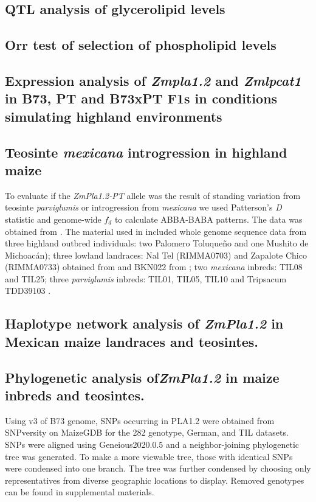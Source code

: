 \documentclass[9pt,twocolumn,twoside]{BioRxiv}
\begin{document}
\subsection{QTL analysis of glycerolipid levels}

\subsection{Orr test of selection of phospholipid levels}

\subsection{Expression analysis of \textit{Zmpla1.2} and \textit{Zmlpcat1} in B73, PT and B73xPT F1s in conditions simulating highland environments}

\subsection{Teosinte \textit{mexicana} introgression in highland maize}
To evaluate if the \textit{ZmPla1.2-PT} allele was the result of standing variation from teosinte \textit{parviglumis} or introgression from \textit{mexicana} we used Patterson's \textit{D} statistic and genome-wide $f_{d}$ to calculate ABBA-BABA patterns. 
The data was obtained from \cite{Gonzalez-Segovia2019-jy}. 
The material used in \cite{Gonzalez-Segovia2019-jy} included whole genome sequence data from three highland outbred individuals: two Palomero Toluqueño and one Mushito de Michoacán); three lowland landraces: Nal Tel (RIMMA0703) and Zapalote Chico (RIMMA0733) obtained from \cite{Wang2017-bc} and  BKN022 from \cite{Bukowski2017-ng}; two \textit{mexicana} inbreds: TIL08 and TIL25; three \textit{parviglumis} inbreds: TIL01, TIL05, TIL10 and Tripsacum TDD39103 \cite{Bukowski2017-ng}. 

\subsection{Haplotype network analysis of \textit{ZmPla1.2} in Mexican maize landraces and teosintes.}

\subsection{Phylogenetic analysis of\textit{ZmPla1.2} in maize inbreds and teosintes.}
Using v3 of B73 genome, SNPs occurring in PLA1.2 were obtained from SNPversity on MaizeGDB for the 282 genotype, German, and TIL datasets. SNPs were aligned using Geneious2020.0.5 and a neighbor-joining phylogenetic tree was generated. To make a more viewable tree, those with identical SNPs were condensed into one branch. The tree was further condensed by choosing only representatives from diverse geographic locations to display. Removed genotypes can be found in supplemental materials. 
\end{document}
